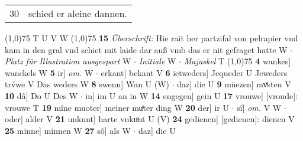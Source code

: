 \documentclass[8pt,a4paper,notitlepage]{article}
\begin{document}
\begin{table}[ht]
\begin{minipage}[t]{0.5\linewidth}
\begin{tabular}{rl}
30 & schied er aleine dannen.\\ 
\end{tabular}
\scriptsize
\line(1,0){75} \newline
T U V W \newline
\line(1,0){75} \newline
\textbf{15} \textit{Überschrift:} Hie rait her partzifal von pelrapier vnd kam in den gral vnd schiet mit laide dar auß vmb das er nit gefraget hatte W   $\cdot$ \textit{Platz für Illustration ausgespart} W   $\cdot$ \textit{Initiale} W   $\cdot$ \textit{Majuskel} T  \newline
\line(1,0){75} \newline
\textbf{4} wankes] wanckels W \textbf{5} ir] \textit{om.} W  $\cdot$ erkant] bekant V \textbf{6} ietweders] Jequeder U Jeweders trv́we V Das weders W \textbf{8} swenn] Wan U (W)  $\cdot$ daz] die U \textbf{9} müezen] mvͤsten V \textbf{10} dâ] Do U Des W  $\cdot$ in] im U an in W \textbf{14} engegen] gein U \textbf{17} vrouwe] [vroude]: vrouwe T \textbf{19} mîne muoter] meiner muͦter ding W \textbf{20} der] ir U  $\cdot$ sî] \textit{om.} V W  $\cdot$ oder] alder V \textbf{21} unkunt] harte vnkuͦnt U (V) \textbf{24} gedienen] [gedienen]: dienen V \textbf{25} minne] minnen W \textbf{27} sô] als W  $\cdot$ daz] die U \newline
\end{minipage}
\end{table}
\end{document}
